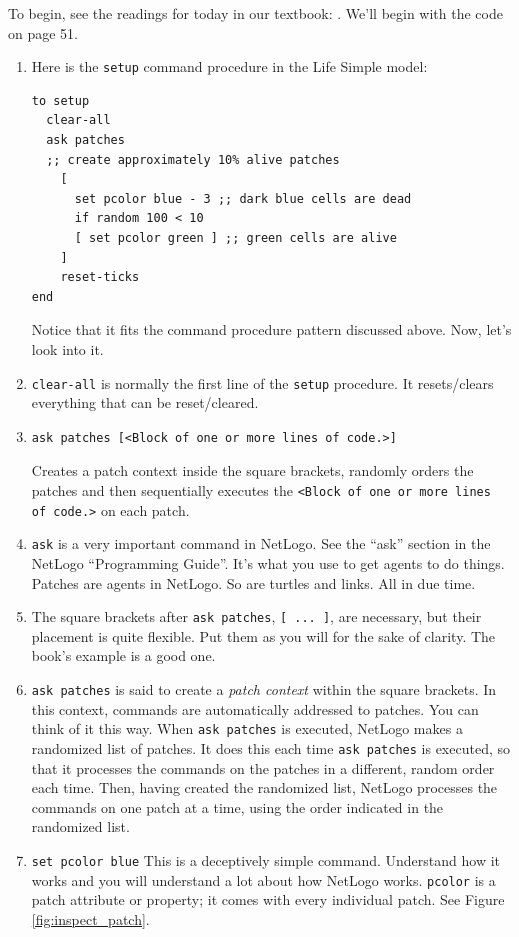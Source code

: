To begin, see the readings for today in our textbook: \citet[chapter 2, pages 45--68]{wilensky_rand_2015}. We'll begin with the code on page 51.

\begin{enumerate}
\item Here is the \texttt{setup} command procedure in the Life Simple model:
\begin{verbatim}
to setup
  clear-all
  ask patches
  ;; create approximately 10% alive patches
    [ 
      set pcolor blue - 3 ;; dark blue cells are dead
      if random 100 < 10 
      [ set pcolor green ] ;; green cells are alive
    ]
    reset-ticks
end
\end{verbatim}
Notice that it fits the command procedure pattern discussed above. Now, let's look into it.

\item \verb+clear-all+ is normally the first line of the \texttt{setup} procedure. It resets/clears everything that can be reset/cleared.

\item \begin{verbatim}
ask patches [<Block of one or more lines of code.>]
\end{verbatim}
Creates a patch context inside the square brackets, randomly orders the patches and then sequentially executes the\newline
 \verb+<Block of one or more lines of code.>+ \newline on each patch.

\item \texttt{ask} is a very important command in NetLogo. See the ``ask'' section in the NetLogo  ``Programming Guide''. It's what you use to get agents to do things. Patches are agents in NetLogo. So are turtles and links. All in due time.
\item The square brackets after \texttt{ask patches}, \verb+[ ... ]+, are necessary, but their placement is quite flexible. Put them as you will for the sake of clarity. The book's example is a good one.

\item  \texttt{ask patches} is said to create a \emph{patch context} within the square brackets. In this context, commands are automatically addressed to patches. You can think of it this way. When  \texttt{ask patches} is executed, NetLogo makes a randomized list of patches. It does this each time  \texttt{ask patches} is executed, so that it processes the commands on the patches in a different, random order each time. Then, having created the randomized list, NetLogo processes the commands on one patch at a time, using the order indicated in the randomized list.
\item \texttt{set pcolor blue} This is a deceptively simple command. Understand how it works and you will understand a lot about how NetLogo works.  \texttt{pcolor} is a patch attribute or property; it comes with every individual patch. See Figure \ref{fig:inspect_patch}.  


\end{enumerate}
